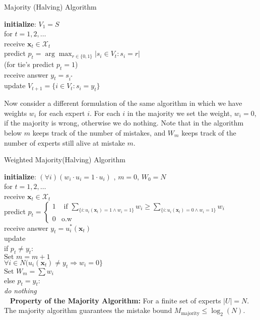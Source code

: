 \documentclass[11pt]{article}
\newcommand\tab[1][1cm]{\hspace*{#1}}
\theoremstyle{quest}
\begin{document}
\begin{tcolorbox}
\begin{center}Majority (Halving) Algorithm \end{center}
\textbf{initialize}: $V_1 = S$  \\ 
for $t = 1, 2, \dots $\\
\tab receive $\mathbf{x}_t \in \mathcal{X}_t $ \\
\tab predict $p_t = \arg \max_{r\in\{0,1\}}|s_i \in V_t: s_i = r|$ \\
\tab\tab (for tie's predict $p_t = 1$)\\
\tab receive answer $y_t = s_{i^*}$\\
\tab update $V_{t+1} = \{i\in V_t: s_i = y_t\}$ 
\end{tcolorbox}
Now consider a different formulation of the same algorithm in which we have weights $w_i$ for each expert $i$. For each $i$ in the majority we set the weight, $w_i=0$, if the majority is wrong, otherwise we do nothing. Note that in the algorithm below $m$ keeps track of the number of mistakes, and $W_m$ keeps track of the number of experts still alive at mistake $m$. 
\begin{tcolorbox}
\begin{center}Weighted Majority(Halving) Algorithm \end{center}
\textbf{initialize}: $(\forall i)(w_i\cdot u_i = 1 \cdot u_i) $ , $m = 0$, $W_0 = N$ \\ 
for $t = 1, 2, \dots $\\
\tab receive $\mathbf{x}_t \in \mathcal{X}_t $ \\
\tab predict $p_t = \begin{cases} 1 & \text{ if } \sum_{\{i: u_i(\mathbf{x}_t) =1 \land w_i = 1\}}w_i\ge \sum_{\{i: u_i(\mathbf{x}_t) =0 \land w_i = 1\}}w_i \\ 0 & \text{o.w} \end{cases}$ \\ 
\tab receive answer $y_t = u_i^{*}(\mathbf{x}_t)$\\
\tab update\\ 
\tab\tab if $p_t \neq y_t$: \\
\tab\tab \tab $\text{Set }  m = m+1$\\
\tab\tab \tab $\forall i \in N(u_i(\mathbf{x}_t) \neq y_t \Rightarrow w_i = 0 \}$  \\ 
\tab\tab \tab $\text{Set } W_m = \sum w_i$ \\
\tab\tab else $p_t = y_t$: \\
\tab\tab \tab \textit{do nothing}\\
\
\textbf{Property of the Majority Algorithm:} For a finite set of experts $|U|=N$. The majority algorithm guarantees the mistake bound $M_\text{majority}\le \log_{2}(N)$. 
\end{tcolorbox}
\end{document}

